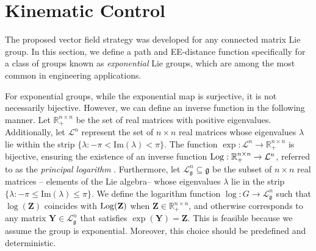 \chapter{Kinematic Control}\label{ch:kinematic}
The proposed vector field strategy was developed for any connected matrix Lie group. In this section, we define a path and EE-distance function specifically for a class of groups known as \emph{exponential} Lie groups, which are among the most common in engineering applications.


For exponential groups, while the exponential map is surjective, it is not necessarily bijective. However, we can define an inverse function in the following manner. Let $\mathbb{R}_+^{n\times n}$ be the set of real matrices with positive eigenvalues. Additionally, let $\mathcal{L}^n$ represent the set of $n\times n$ real matrices whose eigenvalues $\lambda$ lie within the strip $\{\lambda : -\pi < \text{Im}(\lambda) < \pi\}$. The function $\exp:\mathcal{L}^n\to\mathbb{R}_+^{n\times n}$ is bijective, ensuring the existence of an inverse function $\operatorname{Log}: \mathbb{R}_+^{n\times n} \to \mathcal{L}^n$, referred to as the \emph{principal logarithm} \citep[p. 319]{Gallier2020}. Furthermore, let $\mathcal{L}_{\mathfrak{g}}^n\subseteq\mathfrak{g}$ be the subset of $n \times n$ real matrices -- elements of the Lie algebra-- whose eigenvalues $\lambda$ lie in the strip $\{\lambda : -\pi \le \text{Im}(\lambda) \le \pi\}$. We define the logarithm function $\log:G\to\mathcal{L}_{\mathfrak{g}}^n$ such that $\log(\mathbf{Z})$ coincides with $\operatorname{Log}(\mathbf{Z})$ when $\mathbf{Z}\in\mathbb{R}_+^{n\times n}$, and otherwise corresponds to any matrix $\mathbf{Y}\in\mathcal{L}_{\mathfrak{g}}^n$ that satisfies $\exp(\mathbf{Y}) = \mathbf{Z}$. This is feasible because we assume the group is exponential. Moreover, this choice should be predefined and deterministic.

